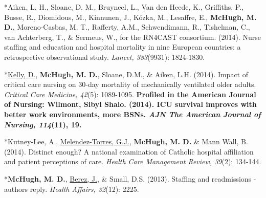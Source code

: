 \documentclass[10pt,]{article}
\begin{document}
{{{{{{{{{{{{{{{\vspace{4mm}

\begin{hangparas}{.25in}{1}

*Aiken, L. H., Sloane, D. M., Bruyneel, L., Van den Heede, K., Griffiths, P., Busse, R., Diomidous, M., Kinnunen, J., Kózka, M., Lesaffre, E., {\textbf {McHugh, M. D.}}, Moreno-Casbas, M. T., Rafferty, A.M., Schwendimann, R., Tishelman, C., van Achterberg, T., \& Sermeus, W., for the RN4CAST consortium. (2014). Nurse staffing and education and hospital mortality in nine European countries: a retrospective observational study. {\textit {Lancet, 383}}(9931): 1824-1830.

\end{hangparas}

\vspace{4mm}

\begin{hangparas}{.25in}{1}

*{\underline {Kelly, D.}}, {\textbf {McHugh, M. D.}}, Sloane, D.M., \& Aiken, L.H. (2014). Impact of critical care nursing on 30-day mortality of mechanically ventilated older adults. {\textit {Critical Care Medicine, 42}}(5): 1089-1095. {\textbf {Profiled in the American Journal of Nursing: Wilmont, Sibyl Shalo. (2014). ICU survival improves with better work environments, more BSNs. {\textit {AJN The American Journal of Nursing, 114}}(11), 19.}}

\end{hangparas}

\vspace{4mm}

\begin{hangparas}{.25in}{1}

*Kutney-Lee, A., {\underline {Melendez-Torres, G.J.}}, {\textbf {McHugh, M. D.}} \& Mann Wall, B. (2014). Distinct enough? A national examination of Catholic hospital affiliation and patient perceptions of care. {\textit {Health Care Management Review, 39}}(2): 134-144.

\end{hangparas}

\vspace{4mm}

\begin{hangparas}{.25in}{1}

*{\textbf {McHugh, M. D.}}, {\underline {Berez, J.}}, \& Small, D.S. (2013). Staffing and readmissions - authors reply. {\textit {Health Affairs, 32}}(12): 2225.


\end{hangparas}}}}}}}}}}}}}}}}
\end{document}
